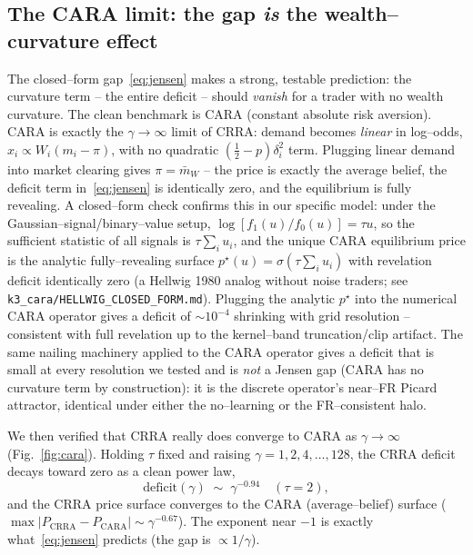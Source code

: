\documentclass[11pt]{article}
\begin{document}
\subsection{The CARA limit: the gap \emph{is} the wealth--curvature effect}
\label{sec:cara}

The closed--form gap~\eqref{eq:jensen} makes a strong, testable prediction:
the curvature term -- the entire deficit -- should \emph{vanish} for a trader
with no wealth curvature. The clean benchmark is CARA (constant absolute risk
aversion). CARA is exactly the $\gamma\to\infty$ limit of CRRA: demand becomes
\emph{linear} in log--odds, $x_i\propto W_i(m_i-\pi)$, with no quadratic
$(\tfrac12-p)\delta_i^2$ term. Plugging linear demand into market clearing
gives $\pi=\bar m_W$ -- the price is exactly the average belief, the deficit
term in~\eqref{eq:jensen} is identically zero, and the equilibrium is fully
revealing. A closed--form check confirms this in our specific model: under
the Gaussian--signal/binary--value setup, $\log[f_1(u)/f_0(u)]=\tau u$, so the
sufficient statistic of all signals is $\tau\sum_i u_i$, and the unique CARA
equilibrium price is the analytic fully--revealing surface
$p^\star(u)=\sigma(\tau\sum_i u_i)$ with revelation deficit identically zero
(a Hellwig 1980 analog without noise traders; see
\texttt{k3\_cara/HELLWIG\_CLOSED\_FORM.md}). Plugging the analytic $p^\star$
into the numerical CARA operator gives a deficit of $\sim10^{-4}$ shrinking
with grid resolution -- consistent with full revelation up to the kernel--band
truncation/clip artifact. The same nailing machinery applied to the CARA
operator gives a deficit that is small at every resolution we tested and is
\emph{not} a Jensen gap (CARA has no curvature term by construction): it is the
discrete operator's near--FR Picard attractor, identical under either the
no--learning or the FR--consistent halo.

We then verified that CRRA really does converge to CARA as
$\gamma\to\infty$ (Fig.~\ref{fig:cara}). Holding $\tau$ fixed and raising
$\gamma=1,2,4,\dots,128$, the CRRA deficit decays toward zero as a clean
power law,
\begin{equation}
  \text{deficit}(\gamma)\;\sim\;\gamma^{-0.94}\quad(\tau=2),
  \label{eq:caradecay}
\end{equation}
and the CRRA price surface converges to the CARA (average--belief) surface
($\max|P_{\mathrm{CRRA}}-P_{\mathrm{CARA}}|\sim\gamma^{-0.67}$). The exponent
near $-1$ is exactly what~\eqref{eq:jensen} predicts (the gap is $\propto
1/\gamma$).
\end{document}
